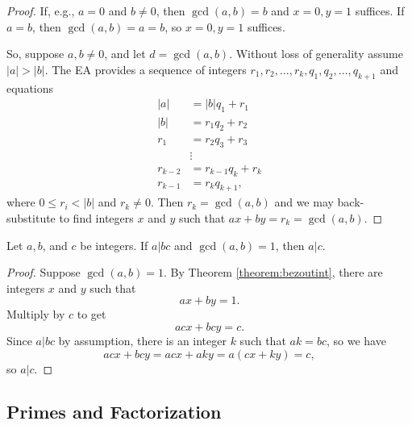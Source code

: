 \documentclass[english,course]{lecture}
\renewcommand{\le}{\leqslant}
\renewcommand{\ge}{\geqslant}
\newenvironment{facnote}{\startfacnote}{}
\def\startfacnote#1\end{\margintext{{\sc Note:} #1}\end}
\theoremstyle{plain}
\def\setof#1#2{{\left\{#1\,\colon\,#2\right\}}}
\def\Z{{\mathbb Z}}
\def\presnotes{}
\begin{document}
\begin{proof}
	If, e.g., $a = 0$ and $b\ne 0$, then $\gcd(a,b) = b$ and $x=0,y=1$ suffices.
	If $a = b$, then $\gcd(a,b) = a = b$, so $x = 0, y = 1$ suffices.
	
	So, suppose $a,b\ne 0$, and let $d = \gcd(a,b)$.
	Without loss of generality assume $|a| > |b|$.
	The EA provides a sequence of integers $r_1, r_2, \ldots, r_k, q_1, q_2, \ldots, q_{k+1}$ and equations 
	\begin{align*}
		|a| &= |b| q_1 + r_1 \\
		|b| &= r_1 q_2 + r_2 \\
		r_1 &= r_2 q_3 + r_3 \\
		&\vdots\\
		r_{k-2} &= r_{k-1} q_k + r_k\\
		r_{k-1} &= r_k q_{k+1},
	\end{align*}
	where $0\le r_i < |b|$ and $r_k \ne 0$.
	Then $r_k = \gcd(a,b)$ and we may back-substitute to find integers $x$ and $y$ such that $ax + by = r_k = \gcd(a,b)$.
\end{proof}

\presnotes

\begin{theorem}\label{theorem:relprimecancel}
	Let $a, b$, and $c$ be integers.
	If $a|bc$ and $\gcd(a,b) = 1$, then $a|c$.
\end{theorem}

\begin{proof}
	Suppose $\gcd(a,b) = 1$.
	By Theorem \ref{theorem:bezoutint}, there are integers $x$ and $y$ such that
	\[
		ax+by = 1.
	\]
	Multiply by $c$ to get
	\[
		acx + bcy = c.
	\]
	Since $a|bc$ by assumption, there is an integer $k$ such that $ak = bc$, so we have
	\[
		acx + bcy = acx + aky = a(cx+ky) = c,
	\]
	so $a|c$.
\end{proof}

\presnotes


\subsection{Primes and Factorization}
\end{document}
